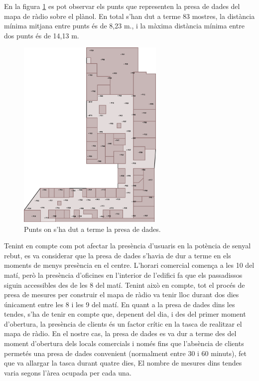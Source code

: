 En la figura \ref{fig:planol_log} es pot observar els punts que representen la presa de dades del mapa de ràdio sobre el plànol. En total s'han dut a terme 83 mostres, la distància mínima mitjana entre punts és de 8,23 m., i la màxima distància mínima entre dos punts és de 14,13 m.

\begin{figure}[ht]
\begin{center}
\includegraphics[width=7cm]{imatges/planol_log.png}
\caption{Punts on s'ha dut a terme la presa de dades.}
\label{fig:planol_log}
\end{center}
\end{figure}


Tenint en compte com pot afectar la presència d'usuaris en la potència de senyal rebut, es va considerar que la presa de dades s'havia de dur a terme en els moments de menys presència en el centre. L'horari comercial comença a les 10 del matí, però la presència d'oficines en l'interior de l'edifici fa que els passadissos siguin accessibles des de les 8 del matí. Tenint això en compte, tot el procés de presa de mesures per construir el mapa de ràdio va tenir lloc durant dos dies únicament entre les 8 i les 9 del matí. En quant a la presa de dades dins les tendes, s'ha de tenir en compte que, depenent del dia, i des del primer moment d'obertura, la presència de clients és un factor crític en la tasca de realitzar el mapa de ràdio. En el nostre cas, la presa de dades es va dur a terme des del moment d'obertura dels locals comercials i només fins que l'absència de clients permetés una presa de dades convenient (normalment entre 30 i 60 minuts), fet que va allargar la tasca durant quatre dies, El nombre de mesures dins tendes varia segons l'àrea ocupada per cada una.

